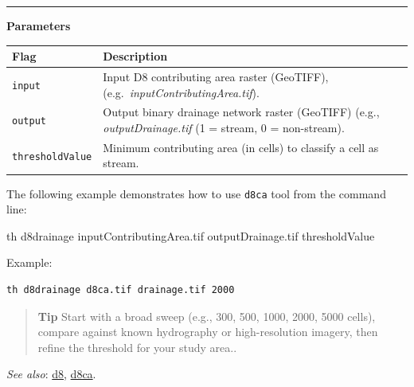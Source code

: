\documentclass[
]{book}
\newenvironment{Shaded}{\begin{snugshade}}{\end{snugshade}}
\newcommand{\ExtensionTok}[1]{#1}
\newcommand{\NormalTok}[1]{#1}
\begin{document}
\begin{center}\rule{0.5\linewidth}{0.5pt}\end{center}

\textbf{Parameters}

\begin{longtable}[]{@{}
  >{\raggedright\arraybackslash}p{}
  >{\raggedright\arraybackslash}p{}@{}}
\toprule\noalign{}
\begin{minipage}[b]{\linewidth}\raggedright
Flag
\end{minipage} & \begin{minipage}[b]{\linewidth}\raggedright
Description
\end{minipage} \\
\midrule\noalign{}
\endhead
\bottomrule\noalign{}
\endlastfoot
\texttt{input} & Input D8 contributing area raster (GeoTIFF), (e.g.~\emph{inputContributingArea.tif}). \\
\texttt{output} & Output binary drainage network raster (GeoTIFF) (e.g., \emph{outputDrainage.tif} (1 = stream, 0 = non-stream). \\
\texttt{thresholdValue} & Minimum contributing area (in cells) to classify a cell as stream. \\
\end{longtable}

The following example demonstrates how to use \texttt{d8ca} tool from the command line:

\begin{Shaded}
\begin{Highlighting}[]
\ExtensionTok{th}\NormalTok{ d8drainage inputContributingArea.tif outputDrainage.tif thresholdValue}
\end{Highlighting}
\end{Shaded}

Example:

\begin{verbatim}
th d8drainage d8ca.tif drainage.tif 2000
\end{verbatim}

\begin{quote}
\textbf{Tip} Start with a broad sweep (e.g., 300, 500, 1000, 2000, 5000 cells), compare against known hydrography or high-resolution imagery, then refine the threshold for your study area..
\end{quote}

\emph{See also}: \hyperref[d8]{d8}, \hyperref[d8ca]{d8ca}.
\end{document}
